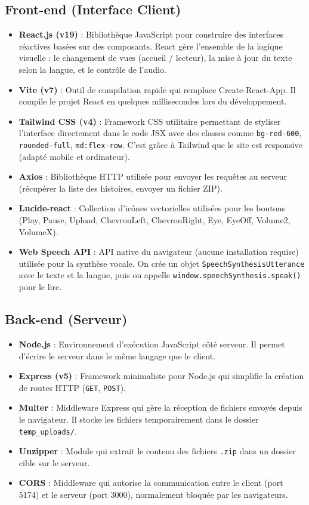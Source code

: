 \documentclass[12pt,twoside,letterpaper]{article}
\begin{document}
\subsection{Front-end (Interface Client)}
\begin{itemize}
    \item \textbf{React.js (v19)} : Bibliothèque JavaScript pour construire des interfaces réactives basées sur des composants. React gère l'ensemble de la logique visuelle : le changement de vues (accueil / lecteur), la mise à jour du texte selon la langue, et le contrôle de l'audio.
    \item \textbf{Vite (v7)} : Outil de compilation rapide qui remplace Create-React-App. Il compile le projet React en quelques millisecondes lors du développement.
    \item \textbf{Tailwind CSS (v4)} : Framework CSS utilitaire permettant de styliser l'interface directement dans le code JSX avec des classes comme \texttt{bg-red-600}, \texttt{rounded-full}, \texttt{md:flex-row}. C'est grâce à Tailwind que le site est responsive (adapté mobile et ordinateur).
    \item \textbf{Axios} : Bibliothèque HTTP utilisée pour envoyer les requêtes au serveur (récupérer la liste des histoires, envoyer un fichier ZIP).
    \item \textbf{Lucide-react} : Collection d'icônes vectorielles utilisées pour les boutons (Play, Pause, Upload, ChevronLeft, ChevronRight, Eye, EyeOff, Volume2, VolumeX).
    \item \textbf{Web Speech API} : API native du navigateur (aucune installation requise) utilisée pour la synthèse vocale. On crée un objet \texttt{SpeechSynthesisUtterance} avec le texte et la langue, puis on appelle \texttt{window.speechSynthesis.speak()} pour le lire.
\end{itemize}

\subsection{Back-end (Serveur)}
\begin{itemize}
    \item \textbf{Node.js} : Environnement d'exécution JavaScript côté serveur. Il permet d'écrire le serveur dans le même langage que le client.
    \item \textbf{Express (v5)} : Framework minimaliste pour Node.js qui simplifie la création de routes HTTP (\texttt{GET}, \texttt{POST}).
    \item \textbf{Multer} : Middleware Express qui gère la réception de fichiers envoyés depuis le navigateur. Il stocke les fichiers temporairement dans le dossier \texttt{temp\_uploads/}.
    \item \textbf{Unzipper} : Module qui extrait le contenu des fichiers \texttt{.zip} dans un dossier cible sur le serveur.
    \item \textbf{CORS} : Middleware qui autorise la communication entre le client (port 5174) et le serveur (port 3000), normalement bloquée par les navigateurs.
\end{itemize}
\end{document}
